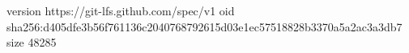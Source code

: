 version https://git-lfs.github.com/spec/v1
oid sha256:d405dfe3b56f761136c2040768792615d03e1ec57518828b3370a5a2ac3a3db7
size 48285

